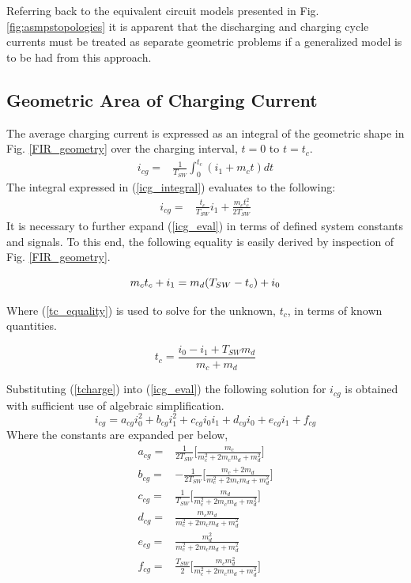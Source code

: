 \documentclass[conference]{IEEEtran}
\begin{document}
Referring back to the equivalent circuit models presented in Fig. \ref{fig:asmpstopologies} it is apparent that the discharging and charging cycle currents must be treated as separate geometric problems if a generalized model is to be had from this approach.

\subsection{Geometric Area of Charging Current}
The average charging current is expressed as an integral of the geometric shape in Fig. \ref{FIR_geometry} over the charging interval, $t=0$ to $t=t_c$.
\begin{align}
i_{cg} = & \frac{1}{T_{SW}}\int_0^{t_c}(i_1 + m_c t)dt \label{icg_integral}
\end{align}
The integral expressed in (\ref{icg_integral}) evaluates to the following:
\begin{align}
i_{cg} = & \frac{t_c}{T_{SW}} i_1 + \frac{m_ct_c^2}{2T_{SW}} \label{icg_eval}
\end{align}
It is necessary to further expand (\ref{icg_eval}) in terms of defined system constants and signals.  To this end, the following equality is easily derived by inspection of Fig. \ref{FIR_geometry}.

\begin{equation}
m_ct_c+i_1 = m_d(T_{SW} - t_c)+i_0\\ \label{tc_equality}
\end{equation}

Where (\ref{tc_equality}) is used to solve for the unknown, $t_c$, in terms of known quantities.

\begin{equation}
t_c = \frac{i_0-i_1+T_{SW}m_d}{m_c+m_d} \label{tcharge}
\end{equation}	

Substituting (\ref{tcharge}) into (\ref{icg_eval}) the following solution for \(i_{cg}\) is obtained with sufficient use of algebraic simplification.
\begin{equation}
i_{cg} = a_{cg}i_0^2+b_{cg}i_1^2+c_{cg}i_0i_1+d_{cg}i_0+e_{cg}i_1+f_{cg} \label{i_cg_canon}
\end{equation}
Where the constants are expanded per below,
\begin{align*}
a_{cg} = & \frac{1}{2T_{SW}} \bigg[ \frac{m_c}{m_c^2+2m_cm_d+m_d^2} \bigg]\nonumber\\
b_{cg} = & -\frac{1}{2T_{SW}} \bigg[ \frac{m_c + 2m_d}{m_c^2+2m_cm_d+m_d^2} \bigg]\nonumber\\
c_{cg} = & \frac{1}{T_{SW}} \bigg[  \frac{m_d}{m_c^2+2m_cm_d+m_d^2} \bigg] \nonumber\\
d_{cg} = & \frac{m_cm_d}{m_c^2+2m_cm_d+m_d^2}\nonumber\\
e_{cg} = & \frac{m_d^2}{m_c^2+2m_cm_d+m_d^2}\nonumber\\
f_{cg} = & \frac{T_{SW}}{2} \bigg[ \frac{m_c m_d^2}{m_c^2+2m_cm_d+m_d^2} \bigg]\nonumber\\
\end{align*}
\end{document}
